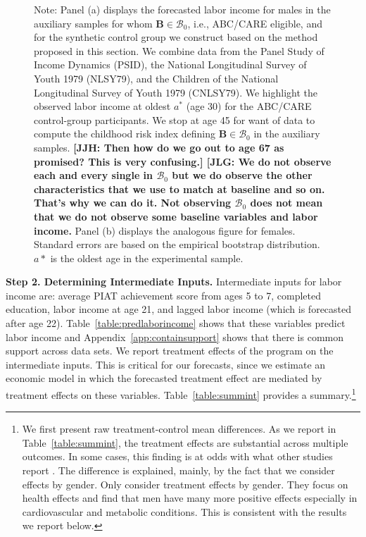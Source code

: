 \begin{figure}
Note: Panel (a) displays the forecasted labor income for males in the auxiliary samples for whom $\bm{B} \in \mathcal{B}_0$, i.e., ABC/CARE eligible, and for the synthetic control group we construct based on the method proposed in this section. We combine data from the Panel Study of Income Dynamics (PSID), the National Longitudinal Survey of Youth 1979 (NLSY79), and the Children of the National Longitudinal Survey of Youth 1979 (CNLSY79). We highlight the observed labor income at oldest $a^*$ (age 30) for the ABC/CARE control-group participants. We stop at age 45 for want of data to compute the childhood risk index defining $\bm{B} \in \mathcal{B}_0$ in the auxiliary samples. \textbf{[JJH: Then how do we go out to age 67 as promised? This is very confusing.] [JLG: We do not observe each and every single in $\mathcal{B}_0$ but we do observe the other characteristics that we use to match at baseline and so on. That's why we can do it. Not observing $\mathcal{B}_0$ does not mean that we do not observe some baseline variables and labor income.} Panel (b) displays the analogous figure for females. Standard errors are based on the empirical bootstrap distribution. $a*$ is the oldest age in the experimental sample. 
\end{figure}

\noindent \textbf{Step 2. Determining Intermediate Inputs.} Intermediate inputs for labor income are: average PIAT achievement score from ages 5 to 7, completed education, labor income at age 21, and lagged labor income (which is forecasted after age 22). Table~\ref{table:predlaborincome} shows that these variables predict labor income and Appendix~\ref{app:containsupport} shows that there is common support across data sets. We report treatment effects of the program on the intermediate inputs. This is critical for our forecasts, since we estimate an economic model in which the forecasted treatment effect are mediated by treatment effects on these variables. Table~\ref{table:summint} provides a summary.\footnote{We first present raw treatment-control mean differences. As we report in Table~\ref{table:summint}, the treatment effects are substantial across multiple outcomes. In some cases, this finding is at odds with what other studies report \citep{Ramey_etal_1985_Project-CARE_TiECSE,Clarke_Campbell_1998_ABC_Comparison_ECRQ,Campbell_Pungello_etal_2001_DP,Campbell_Ramey_etal_2002_ADS,Campbell_Wasik_etal_2008_ECRQ,Campbell_Conti_etal_2014_EarlyChildhoodInvestments}. The difference is explained, mainly, by the fact that we consider effects by gender.  Only \citet{Campbell_Conti_etal_2014_EarlyChildhoodInvestments} consider treatment effects by gender. They focus on health effects and find that men have many more positive effects especially in cardiovascular and metabolic conditions. This is consistent with the results we report below.}

